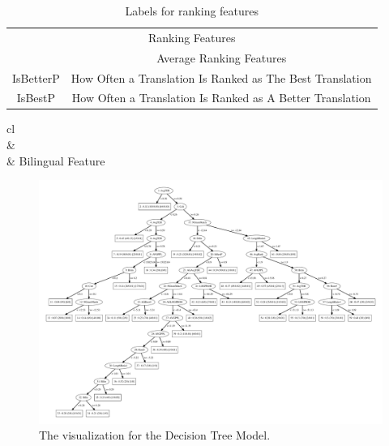 \begin{table}[h]
\center
\begin{tabular}{cc}
\hline
\multicolumn{2}{c}{Ranking Features}                                                       \\ \hhline{==}
\multicolumn{1}{c|}{AvgRank}   & Average Ranking Features                                  \\ \hline
\multicolumn{1}{c|}{IsBetterP} & How Often a Translation Is Ranked as The Best Translation \\ \hline
\multicolumn{1}{c|}{IsBestP}   & How Often a Translation Is Ranked as A Better Translation \\ \hline
\end{tabular}
\label{rankingfeatures}
\caption{Labels for ranking features}
\end{table}

\begin{table}[h]
\center
\begin{tabular}{cl}
\hline
{} \\ \hhline{==}
                    &                    \\ \hline
{}                   & Bilingual Feature                                         \\ \hline
\end{tabular}
\label{calibilinfeatures}
\caption{Labels for calibration and bilingual features}
\end{table}

\begin{figure}[!htb]
  \centering
  \includegraphics[width=\textwidth]{DT/example.pdf}
  \caption{The visualization for the Decision Tree Model.
}
    \label{dtexample}
\end{figure}

